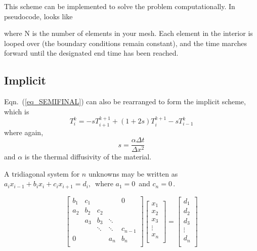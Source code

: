 \documentclass[twocolumn,10pt]{asme2ej}
\begin{document}
This scheme can be implemented to solve the problem computationally. In pseudocode, looks like
\begin{algorithmic}
    \EndFor
\EndWhile
\end{algorithmic}
\noindent where N is the number of elements in your mesh. Each element in the interior is looped over (the boundary conditions remain constant), and the time marches forward until the designated end time has been reached.

\subsection{Implicit}
Eqn.~(\ref{eq_SEMIFINAL}) can also be rearranged to form the implicit scheme, which is
\begin{equation}
T_i^k = -sT_{i+1}^{k+1} +(1+2s)T_i^{k+1} - sT_{i-1}^k
\end{equation}
\noindent where again,
\begin{equation}
s = \frac{\alpha \Delta t}{\Delta x^2}
\end{equation}
\noindent and $\alpha$ is the thermal diffusivity of the material.

A tridiagonal system for $n$ unknowns may be written as $a_i x_{i - 1}  + b_i x_i  + c_i x_{i + 1}  = d_i , \,\!$ where $ a_1  = 0\, $ and $ c_n = 0\, $.

\begin{equation}
\begin{bmatrix}
   {b_1} & {c_1} & {   } & {   } & { 0 } \\
   {a_2} & {b_2} & {c_2} & {   } & {   } \\
   {   } & {a_3} & {b_3} & \ddots & {   } \\
   {   } & {   } & \ddots & \ddots & {c_{n-1}}\\
   { 0 } & {   } & {   } & {a_n} & {b_n}\\
\end{bmatrix}
\begin{bmatrix}
   {x_1 }  \\
   {x_2 }  \\
   {x_3 }  \\
   \vdots   \\
   {x_n }  \\
\end{bmatrix}
=
\begin{bmatrix}
   {d_1 }  \\
   {d_2 }  \\
   {d_3 }  \\
   \vdots   \\
   {d_n }  \\
\end{bmatrix}
\end{equation}
\end{document}
